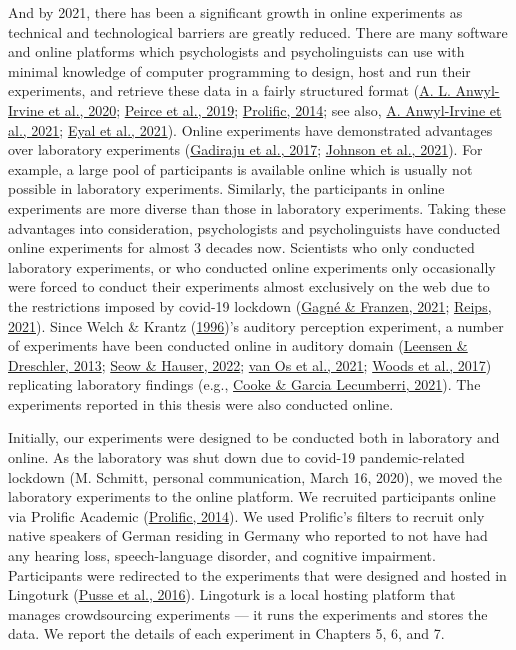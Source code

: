 \documentclass[a4paper, nobind]{templates/ociamthesis}
\begin{document}
And by 2021, there has been a significant growth in online experiments as technical and technological barriers are greatly reduced.
There are many software and online platforms which psychologists and psycholinguists can use with minimal knowledge of computer programming
to design, host and run their experiments, and retrieve these data in a fairly structured format (\protect\hyperlink{ref-Anwylirvine2020}{A. L. Anwyl-Irvine et al., 2020}; \protect\hyperlink{ref-Peirce2019}{Peirce et al., 2019}; \protect\hyperlink{ref-Prolific}{Prolific, 2014}; see also, \protect\hyperlink{ref-Anwylirvine2021}{A. Anwyl-Irvine et al., 2021}; \protect\hyperlink{ref-Eyal2021}{Eyal et al., 2021}).
Online experiments have demonstrated advantages over laboratory experiments (\protect\hyperlink{ref-Gadiraju2017}{Gadiraju et al., 2017}; \protect\hyperlink{ref-Johnson2021}{Johnson et al., 2021}).
For example, a large pool of participants is available online which is usually not possible in laboratory experiments.
Similarly, the participants in online experiments are more diverse than those in laboratory experiments.
Taking these advantages into consideration, psychologists and psycholinguists have conducted online experiments for almost 3 decades now.
Scientists who only conducted laboratory experiments, or who conducted online experiments only occasionally were forced to conduct their experiments almost exclusively on the web due to the restrictions imposed by covid-19 lockdown (\protect\hyperlink{ref-Gagne2021}{Gagné \& Franzen, 2021}; \protect\hyperlink{ref-Reips2021}{Reips, 2021}).
Since Welch \& Krantz (\protect\hyperlink{ref-Welch1996}{1996})'s auditory perception experiment, a number of experiments have been conducted online in auditory domain (\protect\hyperlink{ref-Leensen2013}{Leensen \& Dreschler, 2013}; \protect\hyperlink{ref-Seow2022}{Seow \& Hauser, 2022}; \protect\hyperlink{ref-vanOs2021}{van Os et al., 2021}; \protect\hyperlink{ref-Woods2017}{Woods et al., 2017}) replicating laboratory findings (e.g., \protect\hyperlink{ref-Cooke2021}{Cooke \& Garcia Lecumberri, 2021}).
The experiments reported in this thesis were also conducted online.

Initially, our experiments were designed to be conducted both in laboratory and online.
As the laboratory was shut down due to covid-19 pandemic-related lockdown (M. Schmitt, personal communication, March 16, 2020), we moved the laboratory experiments to the online platform.
We recruited participants online via Prolific Academic (\protect\hyperlink{ref-Prolific}{Prolific, 2014}).
We used Prolific's filters to recruit only native speakers of German residing in Germany
who reported to not have had any hearing loss, speech-language disorder, and cognitive impairment.
Participants were redirected to the experiments that were designed and hosted in Lingoturk (\protect\hyperlink{ref-Pusse2016}{Pusse et al., 2016}).
Lingoturk is a local hosting platform that manages crowdsourcing experiments --- it runs the experiments and stores the data.
We report the details of each experiment in Chapters 5, 6, and 7.
\end{document}
